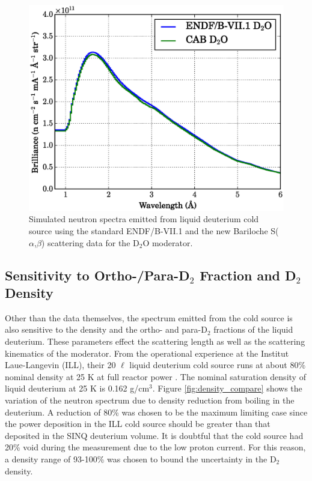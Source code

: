\documentclass[5p,12pt]{elsarticle}
\begin{document}
\begin{figure}[h!] 
  \centering
    \includegraphics[width=\columnwidth]{graphics/data_compare_d2o.eps}
     \caption{Simulated neutron spectra emitted from liquid deuterium cold source using the standard ENDF/B-VII.1 and the new Bariloche S($\alpha$,$\beta$) scattering data for the D$_2$O moderator.   \label{fig:data_compare_d2o}}
\end{figure}

%
%
%
%
%

\subsection{Sensitivity to Ortho-/Para-D$_2$ Fraction and D$_2$ Density}
\label{subsec:frac_den}

Other than the data themselves, the spectrum emitted from the cold source is also sensitive to the density and the ortho- and para-D$_2$ fractions of the liquid deuterium.  These parameters effect the scattering length as well as the scattering kinematics of the moderator.  From the operational experience at the Institut Laue-Langevin (ILL), their 20 $\ell$ liquid deuterium cold source runs at about 80\% nominal density at 25 K at full reactor power \cite{ill_cns}. The nominal saturation density of liquid deuterium at 25 K is 0.162 g/cm$^3$\cite{bnl_cryo}.  Figure \ref{fig:density_compare} shows the variation of the neutron spectrum due to density reduction from boiling in the deuterium.  A reduction of 80\% was chosen to be the maximum limiting case since the power deposition in the ILL cold source should be greater than that deposited in the SINQ deuterium volume.  It is doubtful that the cold source had 20\% void during the measurement due to the low proton current.  For this reason, a density range of 93-100\% was chosen to bound the uncertainty in the D$_2$ density.   
\end{document}
